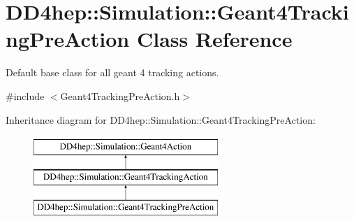 \hypertarget{class_d_d4hep_1_1_simulation_1_1_geant4_tracking_pre_action}{}\section{D\+D4hep\+:\+:Simulation\+:\+:Geant4\+Tracking\+Pre\+Action Class Reference}
\label{class_d_d4hep_1_1_simulation_1_1_geant4_tracking_pre_action}


Default base class for all geant 4 tracking actions.  




{\ttfamily \#include $<$Geant4\+Tracking\+Pre\+Action.\+h$>$}

Inheritance diagram for D\+D4hep\+:\+:Simulation\+:\+:Geant4\+Tracking\+Pre\+Action\+:\begin{figure}[H]
\begin{center}
\leavevmode
\includegraphics[height=3.000000cm]{class_d_d4hep_1_1_simulation_1_1_geant4_tracking_pre_action}
\end{center}
\end{figure}
